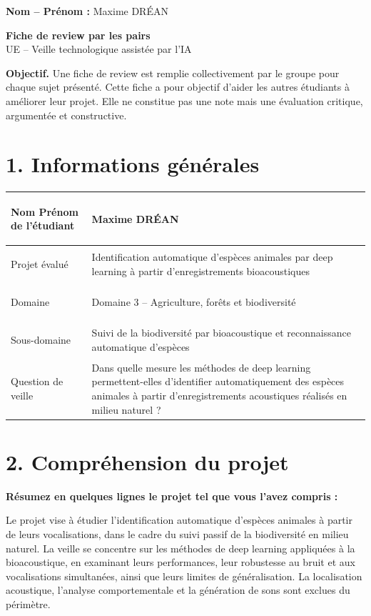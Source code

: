\documentclass[11pt,a4paper]{article}
\begin{document}
\textbf{Nom -- Prénom :} Maxime DRÉAN

\vspace{0.8cm}

\begin{center}
    {\Large \textbf{Fiche de review par les pairs}}\\[0.15cm]
    {\normalsize UE -- Veille technologique assistée par l'IA}
\end{center}

\vspace{0.55cm}

\textbf{Objectif.} Une fiche de review est remplie collectivement par le groupe pour chaque sujet présenté. Cette fiche a pour objectif d'aider les autres étudiants à améliorer leur projet. Elle ne constitue pas une note mais une évaluation critique, argumentée et constructive.

\section*{1. Informations générales}

\small
\setlength{\tabcolsep}{5pt}
\begin{tabularx}{\textwidth}{@{}>{\bfseries\raggedright\arraybackslash}p{4.6cm}X@{}}
\toprule
Nom Prénom de l'étudiant & Maxime DRÉAN \\
\midrule
Projet évalué & Identification automatique d'espèces animales par deep learning à partir d'enregistrements bioacoustiques \\
\midrule
Domaine & Domaine 3 -- Agriculture, forêts et biodiversité \\
\midrule
Sous-domaine & Suivi de la biodiversité par bioacoustique et reconnaissance automatique d'espèces \\
\midrule
Question de veille & Dans quelle mesure les méthodes de deep learning permettent-elles d'identifier automatiquement des espèces animales à partir d'enregistrements acoustiques réalisés en milieu naturel ? \\
\bottomrule
\end{tabularx}
\setlength{\tabcolsep}{6pt}
\normalsize

\section*{2. Compréhension du projet}

\textbf{Résumez en quelques lignes le projet tel que vous l'avez compris :}

Le projet vise à étudier l'identification automatique d'espèces animales à partir de leurs vocalisations, dans le cadre du suivi passif de la biodiversité en milieu naturel. La veille se concentre sur les méthodes de deep learning appliquées à la bioacoustique, en examinant leurs performances, leur robustesse au bruit et aux vocalisations simultanées, ainsi que leurs limites de généralisation. La localisation acoustique, l'analyse comportementale et la génération de sons sont exclues du périmètre.
\end{document}
